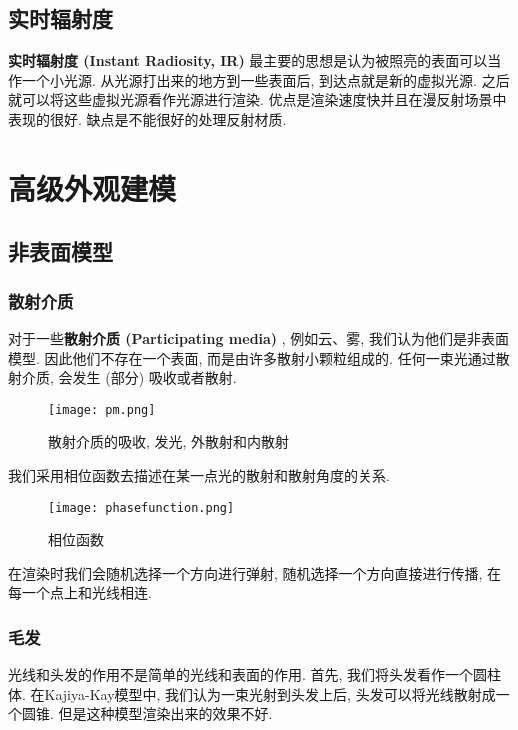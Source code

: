 \documentclass[openany]{progbookcn}
\begin{document}
\subsection{实时辐射度}

\textbf{实时辐射度 (Instant Radiosity, IR) }最主要的思想是认为被照亮的表面可以当作一个小光源. 从光源打出来的地方到一些表面后, 到达点就是新的虚拟光源. 之后就可以将这些虚拟光源看作光源进行渲染. 优点是渲染速度快并且在漫反射场景中表现的很好. 缺点是不能很好的处理反射材质. 

\section{高级外观建模}

\subsection{非表面模型}

\subsubsection{散射介质}

对于一些\textbf{散射介质 (Participating media) }, 例如云、雾, 我们认为他们是非表面模型. 因此他们不存在一个表面, 而是由许多散射小颗粒组成的. 任何一束光通过散射介质, 会发生 (部分) 吸收或者散射. 

\begin{figure}[H]
	\centering
	\texttt{[image: pm.png]}
	\caption{散射介质的吸收, 发光, 外散射和内散射}
	\label{fig:pm}
\end{figure}

我们采用相位函数去描述在某一点光的散射和散射角度的关系. 

\begin{figure}[H]
	\centering
	\texttt{[image: phasefunction.png]}
	\caption{相位函数}
	\label{fig:pf}
\end{figure}

在渲染时我们会随机选择一个方向进行弹射, 随机选择一个方向直接进行传播, 在每一个点上和光线相连. 

\subsubsection{毛发}

光线和头发的作用不是简单的光线和表面的作用. 首先, 我们将头发看作一个圆柱体. 在Kajiya-Kay模型中, 我们认为一束光射到头发上后, 头发可以将光线散射成一个圆锥. 但是这种模型渲染出来的效果不好. 
\end{document}
